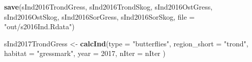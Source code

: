 \documentclass[]{article}
\newenvironment{Shaded}{\begin{snugshade}}{\end{snugshade}}
\newcommand{\KeywordTok}[1]{\textcolor[rgb]{0.13,0.29,0.53}{\textbf{#1}}}
\newcommand{\DataTypeTok}[1]{\textcolor[rgb]{0.13,0.29,0.53}{#1}}
\newcommand{\DecValTok}[1]{\textcolor[rgb]{0.00,0.00,0.81}{#1}}
\newcommand{\StringTok}[1]{\textcolor[rgb]{0.31,0.60,0.02}{#1}}
\newcommand{\NormalTok}[1]{#1}
\begin{document}
\begin{Shaded}
\begin{Highlighting}[]
\KeywordTok{save}\NormalTok{(sInd2016TrondGress, sInd2016TrondSkog, sInd2016OstGress, sInd2016OstSkog, sInd2016SorGress, sInd2016SorSkog, }\DataTypeTok{file =} \StringTok{"out/s2016Ind.Rdata"}\NormalTok{)}
\end{Highlighting}
\end{Shaded}

\begin{Shaded}
\begin{Highlighting}[]
\NormalTok{sInd2017TrondGress <-}\StringTok{ }\KeywordTok{calcInd}\NormalTok{(}\DataTypeTok{type =} \StringTok{"butterflies"}\NormalTok{,}
                              \DataTypeTok{region_short =} \StringTok{"trond"}\NormalTok{,}
                              \DataTypeTok{habitat =} \StringTok{"gressmark"}\NormalTok{,}
                              \DataTypeTok{year =} \DecValTok{2017}\NormalTok{,}
                              \DataTypeTok{nIter =}\NormalTok{ nIter}
\NormalTok{                              )}
       

\end{Highlighting}
\end{Shaded}
\end{document}
